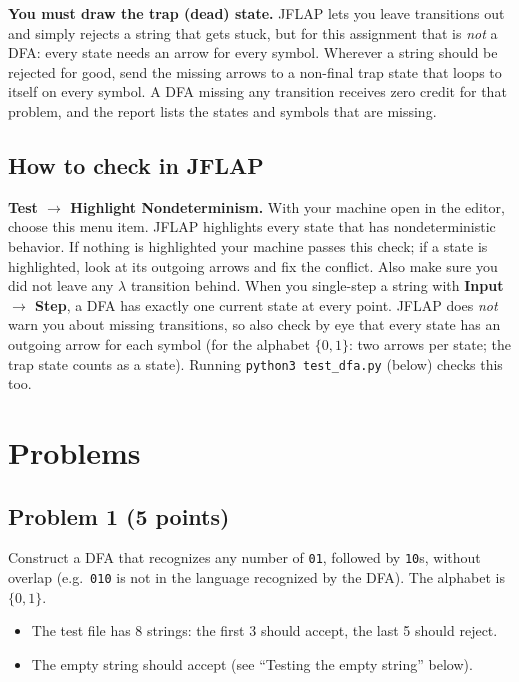\documentclass[11pt]{article}
\begin{document}
\textbf{You must draw the trap (dead) state.} JFLAP lets you leave transitions out and simply
rejects a string that gets stuck, but for this assignment that is \emph{not} a DFA: every state
needs an arrow for every symbol. Wherever a string should be rejected for good, send the missing
arrows to a non-final trap state that loops to itself on every symbol. A DFA missing any
transition receives zero credit for that problem, and the report lists the states and symbols
that are missing.

\subsection*{How to check in JFLAP}

\textbf{Test $\to$ Highlight Nondeterminism.} With your machine open in the editor, choose
this menu item. JFLAP highlights every state that has nondeterministic behavior. If nothing
is highlighted your machine passes this check; if a state is highlighted, look at its
outgoing arrows and fix the conflict. Also make sure you did not leave any $\lambda$
transition behind. When you single-step a string with \textbf{Input $\to$ Step}, a DFA has
exactly one current state at every point. JFLAP does \emph{not} warn you about missing
transitions, so also check by eye that every state has an outgoing arrow for each symbol
(for the alphabet $\{0,1\}$: two arrows per state; the trap state counts as a state). Running
\texttt{python3 test\_dfa.py} (below) checks this too.

\section*{Problems}

\subsection*{Problem 1 (5 points)}
Construct a DFA that recognizes any number of \texttt{01}, followed by \texttt{10}s, without
overlap (e.g.\ \texttt{010} is not in the language recognized by the DFA). The alphabet is
$\{0,1\}$.
\begin{itemize}
  \item The test file has 8 strings: the first 3 should accept, the last 5 should reject.
  \item The empty string should accept (see ``Testing the empty string'' below).
\end{itemize}
\end{document}
